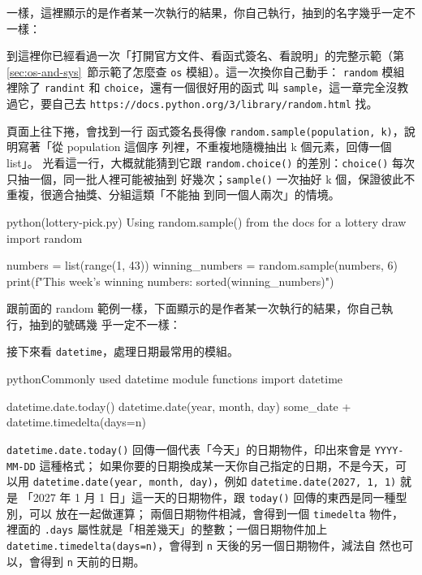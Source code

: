 一樣，這裡顯示的是作者某一次執行的結果，你自己執行，抽到的名字幾乎一定不一樣：


到這裡你已經看過一次「打開官方文件、看函式簽名、看說明」的完整示範（第~
\ref{sec:os-and-sys}~節示範了怎麼查 \texttt{os} 模組）。這一次換你自己動手：
\texttt{random} 模組裡除了 \texttt{randint} 和 \texttt{choice}，還有一個很好用的函式
叫 \texttt{sample}，這一章完全沒教過它，要自己去
\texttt{https://docs.python.org/3/library/random.html} 找。

頁面上往下捲，會找到一行
函式簽名長得像 \texttt{random.sample(population, k)}，說明寫著「從 population 這個序
列裡，不重複地隨機抽出 k 個元素，回傳一個 list」。
光看這一行，大概就能猜到它跟
\texttt{random.choice()} 的差別：\texttt{choice()} 每次只抽一個，同一批人裡可能被抽到
好幾次；\texttt{sample()} 一次抽好 k 個，保證彼此不重複，很適合抽獎、分組這類「不能抽
到同一個人兩次」的情境。

\begin{example}{python}{(lottery-pick.py) Using random.sample() from the docs for a lottery draw}
import random

numbers = list(range(1, 43))
winning_numbers = random.sample(numbers, 6)
print(f"This week's winning numbers: {sorted(winning_numbers)}")
\end{example}

跟前面的 random 範例一樣，下面顯示的是作者某一次執行的結果，你自己執行，抽到的號碼幾
乎一定不一樣：



接下來看 \texttt{datetime}，處理日期最常用的模組。

\begin{code}{python}{Commonly used datetime module functions}
import datetime

datetime.date.today()
datetime.date(year, month, day)
some_date + datetime.timedelta(days=n)
\end{code}

\texttt{datetime.date.today()} 回傳一個代表「今天」的日期物件，印出來會是
\texttt{YYYY-MM-DD} 這種格式；
如果你要的日期換成某一天你自己指定的日期，不是今天，可以用
\texttt{datetime.date(year, month, day)}，例如 \texttt{datetime.date(2027, 1, 1)} 就是
「2027 年 1 月 1 日」這一天的日期物件，跟 \texttt{today()} 回傳的東西是同一種型別，可以
放在一起做運算；
兩個日期物件相減，會得到一個 \texttt{timedelta} 物件，
裡面的 \texttt{.days} 屬性就是「相差幾天」的整數；一個日期物件加上
\texttt{datetime.timedelta(days=n)}，會得到 \texttt{n} 天後的另一個日期物件，減法自
然也可以，會得到 \texttt{n} 天前的日期。

